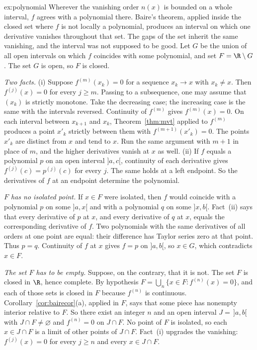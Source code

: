 \begin{solution}{ex:polynomial}
\idea Wherever the vanishing order $n(x)$ is bounded on a whole interval, $f$ agrees with a polynomial there. Baire's theorem, applied inside the closed set where $f$ is not locally a polynomial, produces an interval on which one derivative vanishes throughout that set. The gaps of the set inherit the same vanishing, and the interval was not supposed to be good.
\writeup Let $G$ be the union of all open intervals on which $f$ coincides with some polynomial, and set $F=\R\setminus G$. The set $G$ is open, so $F$ is closed.

\emph{Two facts.} (i) Suppose $f^{(m)}(x_k)=0$ for a sequence $x_k\to x$ with $x_k\ne x$. Then $f^{(j)}(x)=0$ for every $j\ge m$. Passing to a subsequence, one may assume that $(x_k)$ is strictly monotone. Take the decreasing case; the increasing case is the same with the intervals reversed. Continuity of $f^{(m)}$ gives $f^{(m)}(x)=0$. On each interval between $x_{k+1}$ and $x_k$, Theorem~\ref{thm:mvt} applied to $f^{(m)}$ produces a point $x'_k$ strictly between them with $f^{(m+1)}(x'_k)=0$. The points $x'_k$ are distinct from $x$ and tend to $x$. Run the same argument with $m+1$ in place of $m$, and the higher derivatives vanish at $x$ as well. (ii) If $f$ equals a polynomial $p$ on an open interval $]a,c[$, continuity of each derivative gives $f^{(j)}(c)=p^{(j)}(c)$ for every $j$. The same holds at a left endpoint. So the derivatives of $f$ at an endpoint determine the polynomial.

\emph{$F$ has no isolated point.} If $x\in F$ were isolated, then $f$ would coincide with a polynomial $p$ on some $]a,x[$ and with a polynomial $q$ on some $]x,b[$. Fact~(ii) says that every derivative of $p$ at $x$, and every derivative of $q$ at $x$, equals the corresponding derivative of $f$. Two polynomials with the same derivatives of all orders at one point are equal: their difference has Taylor series zero at that point. Thus $p=q$. Continuity of $f$ at $x$ gives $f=p$ on $]a,b[$, so $x\in G$, which contradicts $x\in F$.

\emph{The set $F$ has to be empty.} Suppose, on the contrary, that it is not. The set $F$ is closed in $\R$, hence complete. By hypothesis $F=\bigcup_n\{x\in F:f^{(n)}(x)=0\}$, and each of those sets is closed in $F$ because $f^{(n)}$ is continuous. Corollary~\ref{cor:bairecor}(a), applied in $F$, says that some piece has nonempty interior relative to $F$. So there exist an integer $n$ and an open interval $J=\,]a,b[$ with $J\cap F\ne\varnothing$ and $f^{(n)}=0$ on $J\cap F$. No point of $F$ is isolated, so each $x\in J\cap F$ is a limit of other points of $J\cap F$. Fact~(i) upgrades the vanishing: $f^{(j)}(x)=0$ for every $j\ge n$ and every $x\in J\cap F$.


\end{solution}
